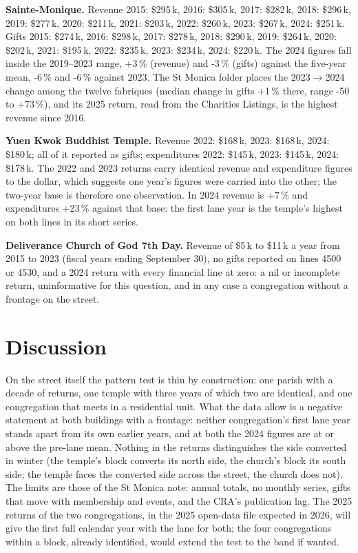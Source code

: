 \documentclass[11pt,a4paper]{article}
\begin{document}
\textbf{Sainte-Monique.} Revenue 2015: \$295\,k, 2016: \$305\,k, 2017: \$282\,k, 2018: \$296\,k, 2019: \$277\,k, 2020: \$211\,k, 2021: \$203\,k, 2022: \$260\,k, 2023: \$267\,k, 2024: \$251\,k. Gifts 2015: \$274\,k, 2016: \$298\,k, 2017: \$278\,k, 2018: \$290\,k, 2019: \$264\,k, 2020: \$202\,k, 2021: \$195\,k, 2022: \$235\,k, 2023: \$234\,k, 2024: \$220\,k. The 2024 figures fall inside the 2019--2023 range, +3\,\% (revenue) and -3\,\% (gifts) against the five-year mean, -6\,\% and -6\,\% against 2023. The St Monica folder places the 2023$\to$2024 change among the twelve fabriques (median change in gifts +1\,\% there, range -50 to +73\,\%), and its 2025 return, read from the Charities Listings, is the highest revenue since 2016.

\textbf{Yuen Kwok Buddhist Temple.} Revenue 2022: \$168\,k, 2023: \$168\,k, 2024: \$180\,k; all of it reported as gifts; expenditures 2022: \$145\,k, 2023: \$145\,k, 2024: \$178\,k. The 2022 and 2023 returns carry identical revenue and expenditure figures to the dollar, which suggests one year\textquoteright{}s figures were carried into the other; the two-year base is therefore one observation. In 2024 revenue is +7\,\% and expenditures +23\,\% against that base: the first lane year is the temple\textquoteright{}s highest on both lines in its short series.

\textbf{Deliverance Church of God 7th Day.} Revenue of \$5\,k to \$11\,k a year from 2015 to 2023 (fiscal years ending September 30), no gifts reported on lines 4500 or 4530, and a 2024 return with every financial line at zero: a nil or incomplete return, uninformative for this question, and in any case a congregation without a frontage on the street.

\section*{Discussion}
On the street itself the pattern test is thin by construction: one parish with a decade of returns, one temple with three years of which two are identical, and one congregation that meets in a residential unit. What the data allow is a negative statement at both buildings with a frontage: neither congregation\textquoteright{}s first lane year stands apart from its own earlier years, and at both the 2024 figures are at or above the pre-lane mean. Nothing in the returns distinguishes the side converted in winter (the temple\textquoteright{}s block converts its north side, the church\textquoteright{}s block its south side; the temple faces the converted side across the street, the church does not). The limits are those of the St Monica note: annual totals, no monthly series, gifts that move with membership and events, and the CRA\textquoteright{}s publication lag. The 2025 returns of the two congregations, in the 2025 open-data file expected in 2026, will give the first full calendar year with the lane for both; the four congregations within a block, already identified, would extend the test to the band if wanted.
\end{document}
